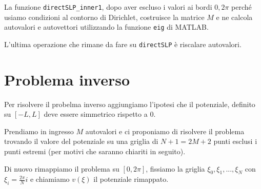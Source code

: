 \documentclass[a4paper,10pt]{article}
\theoremstyle{plain}
\theoremstyle{definition}
\theoremstyle{remark}
\begin{document}
La funzione \lstinline{directSLP_inner1}, dopo aver escluso i valori
ai bordi $0,2\pi$ perché usiamo condizioni al contorno di Dirichlet,
costruisce la matrice $M$ e ne calcola autovalori e autovettori
utilizzando la funzione \lstinline{eig} di MATLAB.

L'ultima operazione che rimane da fare su \lstinline{directSLP} è
riscalare autovalori.


\section{Problema inverso}

Per risolvere il probelma inverso aggiungiamo l'ipotesi che il
potenziale, definito su $[-L,L]$ deve essere simmetrico rispetto a
$0$. 

Prendiamo in ingresso $M$ autovalori e ci proponiamo di risolvere il
problema trovando il valore del potenziale su una griglia di $N +1 =
2M+2$ punti esclusi i punti estremi (per motivi che saranno chiariti
in seguito).

Di nuovo rimappiamo il problema su $[0,2\pi]$, fissiamo la griglia
$\xi _0, \xi _1, ..., \xi _N$ con $\xi _i = \frac{2\pi}{N}i$ e
chiamiamo $v(\xi)$ il potenziale rimappato.
\end{document}
